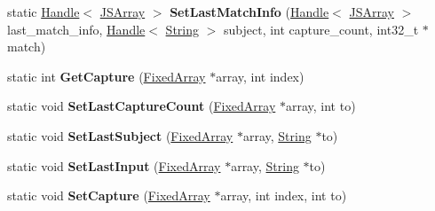 \begin{DoxyCompactItemize}
\item 
\hypertarget{classv8_1_1internal_1_1_reg_exp_impl_a67164089ba7ffc8453d6904d3f5c137b}{}static \hyperlink{classv8_1_1internal_1_1_handle}{Handle}$<$ \hyperlink{classv8_1_1internal_1_1_j_s_array}{J\+S\+Array} $>$ {\bfseries Set\+Last\+Match\+Info} (\hyperlink{classv8_1_1internal_1_1_handle}{Handle}$<$ \hyperlink{classv8_1_1internal_1_1_j_s_array}{J\+S\+Array} $>$ last\+\_\+match\+\_\+info, \hyperlink{classv8_1_1internal_1_1_handle}{Handle}$<$ \hyperlink{classv8_1_1internal_1_1_string}{String} $>$ subject, int capture\+\_\+count, int32\+\_\+t $\ast$match)\label{classv8_1_1internal_1_1_reg_exp_impl_a67164089ba7ffc8453d6904d3f5c137b}

\item 
\hypertarget{classv8_1_1internal_1_1_reg_exp_impl_a5dd44e4fc1188cac4efb085f6bcfb6fb}{}static int {\bfseries Get\+Capture} (\hyperlink{classv8_1_1internal_1_1_fixed_array}{Fixed\+Array} $\ast$array, int index)\label{classv8_1_1internal_1_1_reg_exp_impl_a5dd44e4fc1188cac4efb085f6bcfb6fb}

\item 
\hypertarget{classv8_1_1internal_1_1_reg_exp_impl_a1a4d42cc2678b41f065bc2b1ab2efb07}{}static void {\bfseries Set\+Last\+Capture\+Count} (\hyperlink{classv8_1_1internal_1_1_fixed_array}{Fixed\+Array} $\ast$array, int to)\label{classv8_1_1internal_1_1_reg_exp_impl_a1a4d42cc2678b41f065bc2b1ab2efb07}

\item 
\hypertarget{classv8_1_1internal_1_1_reg_exp_impl_a3481d9869ca0a105b4ab7cf18daa67e3}{}static void {\bfseries Set\+Last\+Subject} (\hyperlink{classv8_1_1internal_1_1_fixed_array}{Fixed\+Array} $\ast$array, \hyperlink{classv8_1_1internal_1_1_string}{String} $\ast$to)\label{classv8_1_1internal_1_1_reg_exp_impl_a3481d9869ca0a105b4ab7cf18daa67e3}

\item 
\hypertarget{classv8_1_1internal_1_1_reg_exp_impl_a918a445230fd9f16e78f77ea833ebe97}{}static void {\bfseries Set\+Last\+Input} (\hyperlink{classv8_1_1internal_1_1_fixed_array}{Fixed\+Array} $\ast$array, \hyperlink{classv8_1_1internal_1_1_string}{String} $\ast$to)\label{classv8_1_1internal_1_1_reg_exp_impl_a918a445230fd9f16e78f77ea833ebe97}

\item 
\hypertarget{classv8_1_1internal_1_1_reg_exp_impl_a57f7f5fc885a711c15bd48fb871126df}{}static void {\bfseries Set\+Capture} (\hyperlink{classv8_1_1internal_1_1_fixed_array}{Fixed\+Array} $\ast$array, int index, int to)\label{classv8_1_1internal_1_1_reg_exp_impl_a57f7f5fc885a711c15bd48fb871126df}


\end{DoxyCompactItemize}
